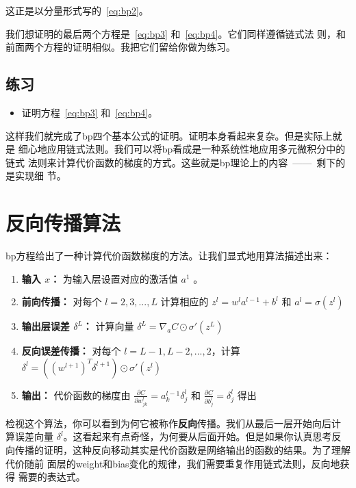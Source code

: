 这正是以分量形式写的~\eqref{eq:bp2}。

我们想证明的最后两个方程是~\eqref{eq:bp3} 和~\eqref{eq:bp4}。它们同样遵循链式法
则，和前面两个方程的证明相似。我把它们留给你做为练习。

\subsection*{练习}

\begin{itemize}
\item 证明方程~\eqref{eq:bp3} 和~\eqref{eq:bp4}。
\end{itemize}

这样我们就完成了\gls*{bp}四个基本公式的证明。证明本身看起来复杂。但是实际上就是
细心地应用链式法则。我们可以将\gls*{bp}看成是一种系统性地应用多元微积分中的链式
法则来计算代价函数的梯度的方式。这些就是\gls*{bp}理论上的内容~——~剩下的是实现细
节。

\section{反向传播算法}
\label{sec:the_backpropagation_algorithm}

\gls*{bp}方程给出了一种计算代价函数梯度的方法。让我们显式地用算法描述出来：

\begin{enumerate}
\item \textbf{输入 $x$：} 为输入层设置对应的激活值 $a^{1}$ 。
\item \textbf{前向传播：} 对每个 $l=2,3,...,L$ 计算相应的 $z^l = w^la^{l-1} +
  b^l$ 和 $a^l = \sigma(z^l)$
\item \textbf{输出层误差 $\delta^L$：} 计算向量 $\delta^L = \nabla_a C \odot
  \sigma'(z^L)$
\item \textbf{反向误差传播：} 对每个 $l=L-1, L-2,...,2$，计算
  $\delta^l = ((w^{l+1})^T\delta^{l+1})\odot \sigma'(z^l)$
\item \textbf{输出：} 代价函数的梯度由 $\frac{\partial C}{\partial w^l_{jk}} =
  a^{l-1}_k \delta^l_j$ 和 $\frac{\partial C}{\partial b_j^l} = \delta_j^l$ 得出
\end{enumerate}

检视这个算法，你可以看到为何它被称作\textbf{反向}传播。我们从最后一层开始向后计
算误差向量 $\delta^l$。这看起来有点奇怪，为何要从后面开始。但是如果你认真思考反
向传播的证明，这种反向移动其实是代价函数是网络输出的函数的结果。为了理解代价随前
面层的\gls*{weight}和\gls*{bias}变化的规律，我们需要重复作用链式法则，反向地获得
需要的表达式。

